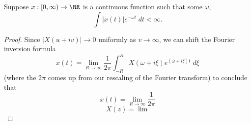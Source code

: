 \begin{theorem}
    Suppose $x: [0,\infty) \to \RR$ is a continuous function such that some $\omega$,
    \[ \int |x(t)| e^{-\omega t}\; dt < \infty. \]
\end{theorem}
\begin{proof}
    Since $|X(u + iv)| \to 0$ uniformly as $v \to \infty$, we can shift the Fourier inversion formula
    \[ x(t) = \lim_{R \to \infty} \frac{1}{2\pi} \int_{-R}^R X(\omega + i\xi) e^{(\omega + i\xi)t}\; d\xi \]
    (where the $2\pi$ comes up from our rescaling of the Fourier transform) to conclude that
    \[ x(t) = \lim_{R \to \infty} \frac{1}{2\pi} \]
    \[ X(z) = \lim_{} \]
\end{proof}














